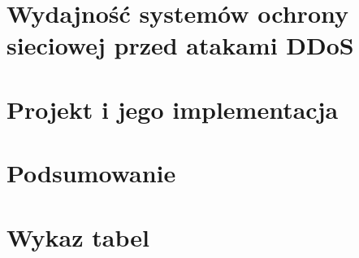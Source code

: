 \documentclass[a4paper,12pt,oneside,openany,titlepage]{book}
\begin{document}




\chapter{Wydajność systemów ochrony sieciowej przed atakami DDoS}

\chapter{Projekt i jego implementacja}



\chapter{Podsumowanie}

\chapter{Wykaz tabel}
\end{document}
